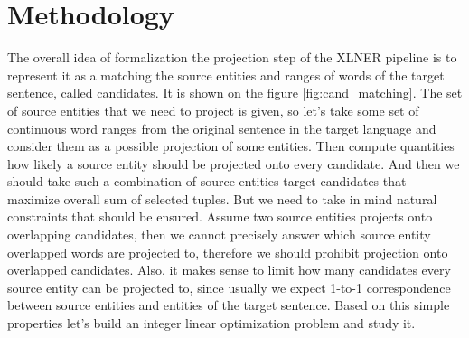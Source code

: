 \chapter{Methodology}
\label{sec:methodology}
The overall idea of formalization the projection step of the XLNER pipeline
is to represent it as a matching the source entities and ranges of words
of the target sentence, called candidates. It is shown on the figure \ref{fig:cand_matching}.
The set of source entities that we need to project is given, so let's take some set of
continuous word ranges from the original sentence in the target language
and consider them as a possible projection of some entities. Then compute
quantities how likely a source entity should be projected onto every candidate.
And then we should take such a combination of source entities-target candidates
that maximize overall sum of selected tuples. But we need to take in mind
natural constraints that should be ensured. Assume two source entities
projects onto overlapping candidates, then we cannot precisely answer which source
entity overlapped words are projected to, therefore we should prohibit projection
onto overlapped candidates. Also, it makes sense to limit how many candidates every
source entity can be projected to, since usually we expect 1-to-1 correspondence
between source entities and entities of the target sentence. Based on this simple
properties let's build an integer linear optimization problem and study it.

